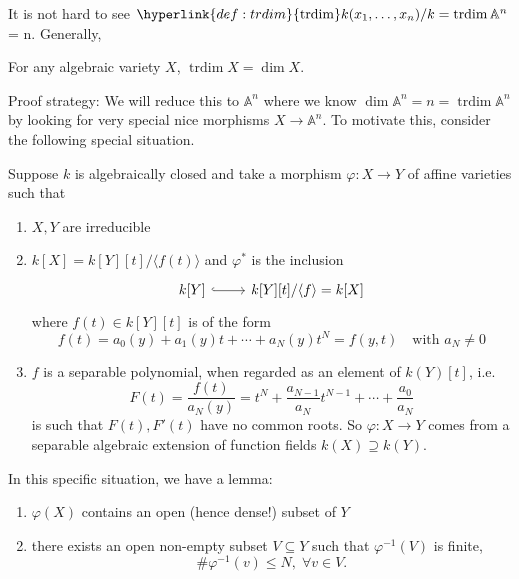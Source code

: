 \documentclass{article}
\newcommand{\A}{\mathbb{A}}
\DeclareMathOperator{\trdim}{trdim}
\begin{document}
It is not hard to see $\hyperlink{def:trdim}{\trdim} k(x_1, \dotsc, x_n)/k = \trdim \A^n$ = n. Generally,
\begin{thm}
    For any algebraic variety $X$, $\trdim X = \dim X$.
\end{thm}
Proof strategy: We will reduce this to $\A^n$ where we know $\dim \A^n = n = \trdim \A^n$ by looking for very special nice morphisms $X \to \A^n$.
To motivate this, consider the following special situation.

Suppose $k$ is algebraically closed and take a morphism $\varphi: X \to Y$ of affine varieties such that
\begin{enumerate}[label=(\arabic*)]
    \item $X, Y$ are irreducible
    \item $ k[X] = k[Y][t]/\langle f(t) \rangle $
        and $\varphi^*$ is the inclusion
        \begin{equation*}
            \begin{tikzcd}
                k[Y] \rar[hookrightarrow]& k[Y][t]/\langle f\rangle = k[X]
            \end{tikzcd}
        \end{equation*}
        where $f(t) \in k[Y][t]$ is of the form
        \begin{equation*}
            f(t) = a_0(y) + a_1(y)t + \dotsb + a_N(y) t^N = f(y, t) \quad \text{with } a_N \neq 0
        \end{equation*}
    \item $f$ is a separable polynomial, when regarded as an element of $k(Y)[t]$, i.e.\
        \begin{equation*}
            F(t) = \frac{f(t)}{a_N(y)} = t^N + \frac{a_{N-1}}{a_N} t^{N-1} + \dotsb + \frac{a_0}{a_N}
        \end{equation*}
        is such that $F(t), F'(t)$ have no common roots.
        So $\varphi: X \to Y$ comes from a separable algebraic extension of function fields $k(X) \supseteq k(Y)$.  %
\end{enumerate}
In this specific situation, we have a lemma:
\begin{lemma}
    \leavevmode
    \begin{enumerate}[label=(\alph*)]
        \item $\varphi(X)$ contains an open (hence dense!) subset of $Y$
        \item there exists an open non-empty subset $V \subseteq Y$ such that $\varphi^{-1}(V)$ is finite,
            \begin{equation*}\# \varphi^{-1}(v) \leq N, \; \forall v \in V.\end{equation*}
    \end{enumerate}
\end{lemma}
\end{document}
